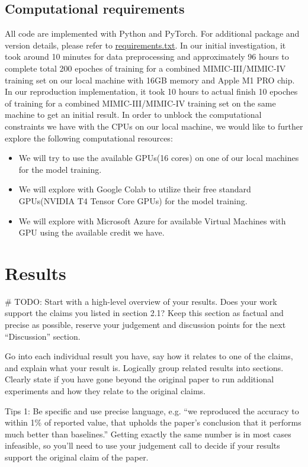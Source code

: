 \documentclass[11pt,a4paper]{article}
\begin{document}
\subsection{Computational requirements}
All code are implemented with Python and PyTorch. For additional package and version details, please refer to \href{https://github.com/willtsai/dlh-sp23-team53/blob/main/requirements.txt}{requirements.txt}. In our initial investigation, it took around 10 minutes for data preprocessing and approximately 96 hours to complete 
total 200 epoches of training for a combined MIMIC-III/MIMIC-IV training set on our local machine with 16GB memory and Apple M1 PRO chip. In our reproduction implementation, it took 10 hours to actual finish 10 epoches of training for a combined MIMIC-III/MIMIC-IV training set on the same machine to get an initial result. 
In order to unblock the computational constraints we have with the CPUs on our local machine, we would like to further explore the following computational resources:
\begin{itemize}
  \item We will try to use the available GPUs(16 cores) on one of our local machines for the model training.
  \item We will explore with Google Colab to utilize their free standard GPUs(NVIDIA T4 Tensor Core GPUs) for the model training.
  \item We will explore with Microsoft Azure for available Virtual Machines with GPU using the available credit we have.
\end{itemize}

\section{Results}
\# TODO:
Start with a high-level overview of your results. Does your work support the claims you listed in section 2.1? Keep this section as factual and precise as possible, reserve your judgement and discussion points for the next ``Discussion'' section. 

Go into each individual result you have, say how it relates to one of the claims, and explain what your result is. Logically group related results into sections. Clearly state if you have gone beyond the original paper to run additional experiments and how they relate to the original claims. 

Tips 1: Be specific and use precise language, e.g. ``we reproduced the accuracy to within 1\% of reported value, that upholds the paper's conclusion that it performs much better than baselines.'' Getting exactly the same number is in most cases infeasible, so you'll need to use your judgement call to decide if your results support the original claim of the paper. 
\end{document}
